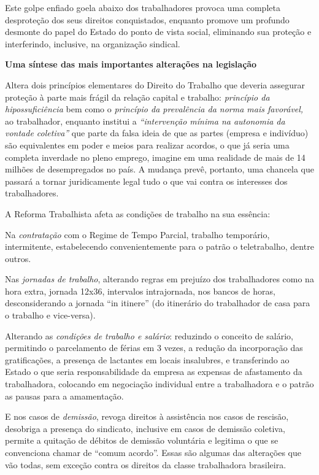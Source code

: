 Este golpe enfiado goela abaixo dos trabalhadores provoca uma completa
desproteção dos seus direitos conquistados, enquanto promove um profundo
desmonte do papel do Estado do ponto de vista social, eliminando sua
proteção e interferindo, inclusive, na organização sindical.

\textbf{Uma síntese das mais importantes alterações na legislação}

Altera dois princípios elementares do Direito do Trabalho que deveria
assegurar proteção à parte mais frágil da relação capital e trabalho:
\emph{princípio da hipossuficiência} bem como o \emph{princípio da
prevalência da norma mais favorável,} ao trabalhador, enquanto institui
a \emph{``intervenção mínima na autonomia da vontade coletiva''} que
parte da falsa ideia de que as partes (empresa e indivíduo) são
equivalentes em poder e meios para realizar acordos, o que já seria uma
completa inverdade no pleno emprego, imagine em uma realidade de mais de
14 milhões de desempregados no país. A mudança prevê, portanto, uma
chancela que passará a tornar juridicamente legal tudo o que vai contra
os interesses dos trabalhadores.

A Reforma Trabalhista afeta as condições de trabalho na sua essência:

Na \emph{contratação} com o Regime de Tempo Parcial, trabalho
temporário, intermitente, estabelecendo convenientemente para o patrão o
teletrabalho, dentre outros.

Nas \emph{jornadas de trabalho}, alterando regras em prejuízo dos
trabalhadores como na hora extra, jornada 12x36, intervalos
intrajornada, nos bancos de horas, desconsiderando a jornada ``in
itinere'' (do itinerário do trabalhador de casa para o trabalho e
vice-versa).

Alterando as \emph{condições de trabalho e salário}: reduzindo o
conceito de salário, permitindo o parcelamento de férias em 3 vezes, a
redução da incorporação das gratificações, a presença de lactantes em
locais insalubres, e transferindo ao Estado o que seria responsabilidade
da empresa as expensas de afastamento da trabalhadora, colocando em
negociação individual entre a trabalhadora e o patrão as pausas para a
amamentação.

E nos casos de \emph{demissão}, revoga direitos à assistência nos casos
de rescisão, desobriga a presença do sindicato, inclusive em casos de
demissão coletiva, permite a quitação de débitos de demissão voluntária
e legitima o que se convenciona chamar de ``comum acordo''. Essas são
algumas das alterações que vão todas, sem exceção contra os direitos da
classe trabalhadora brasileira.

